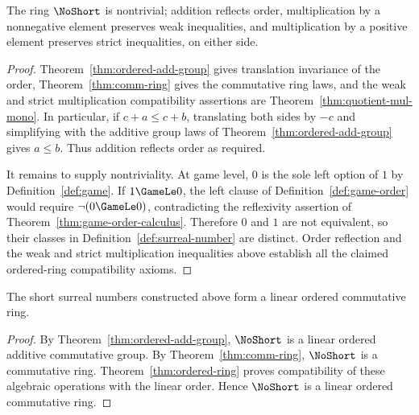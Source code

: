 \begin{theorem}
  \label{thm:ordered-ring}
  \leanok
  The ring \(\NoShort\) is nontrivial; addition reflects order, multiplication by a
  nonnegative element preserves weak inequalities, and multiplication by a positive element
  preserves strict inequalities, on either side.
\end{theorem}
\begin{proof}
  \leanok
  Theorem~\ref{thm:ordered-add-group} gives translation invariance of the
  order, Theorem~\ref{thm:comm-ring} gives the commutative ring laws, and the
  weak and strict multiplication compatibility assertions are
  Theorem~\ref{thm:quotient-mul-mono}.  In particular, if
  \(c+a\leq c+b\), translating both sides by \(-c\) and simplifying with the
  additive group laws of Theorem~\ref{thm:ordered-add-group} gives
  \(a\leq b\).  Thus addition reflects order as required.

  It remains to supply nontriviality.  At game level, \(0\) is the sole left
  option of \(1\) by Definition~\ref{def:game}.  If \(1\GameLe0\), the left
  clause of Definition~\ref{def:game-order} would require
  \(\neg(0\GameLe0)\), contradicting the reflexivity assertion of
  Theorem~\ref{thm:game-order-calculus}.  Therefore \(0\) and \(1\) are not
  equivalent, so their classes in Definition~\ref{def:surreal-number} are
  distinct.  Order reflection and the weak and strict multiplication
  inequalities above establish all the claimed ordered-ring
  compatibility axioms.
\end{proof}

\begin{corollary}
  \label{thm:main-endpoint}
  \leanok
  The short surreal numbers constructed above form a linear ordered commutative ring.
\end{corollary}
\begin{proof}
  \leanok
  By Theorem~\ref{thm:ordered-add-group}, \(\NoShort\) is a linear ordered
  additive commutative group.  By Theorem~\ref{thm:comm-ring}, \(\NoShort\) is
  a commutative ring.
  Theorem~\ref{thm:ordered-ring} proves compatibility of these algebraic
  operations with the linear order.  Hence \(\NoShort\) is a linear ordered
  commutative ring.
\end{proof}

